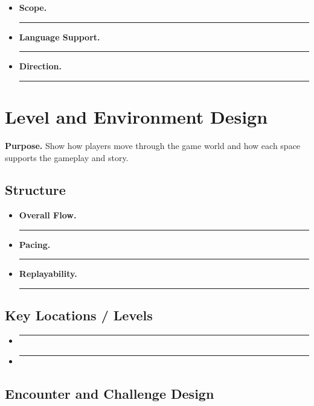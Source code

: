 \documentclass[12pt]{article}
\newcommand{\placeholder}[1]{\rule[-0.4em]{0pt}{2em}\rule{0.62\linewidth}{0.4pt}}
\begin{document}
\begin{itemize}
    \item \textbf{Scope.} \placeholder{Fully voiced, partial VO, or none.}
    \item \textbf{Language Support.} \placeholder{Supported languages and localization plans.}
    \item \textbf{Direction.} \placeholder{Desired performance style and constraints.}
\end{itemize}

\section{Level and Environment Design}

\textbf{Purpose.} Show how players move through the game world and how each space supports the
gameplay and story.

\subsection{Structure}

\begin{itemize}
    \item \textbf{Overall Flow.} \placeholder{Linear, hub-and-spoke, open world, mission-based, etc.}
    \item \textbf{Pacing.} \placeholder{How intensity, challenge, and downtime are arranged.}
    \item \textbf{Replayability.} \placeholder{Shortcuts, secrets, multiple paths, optional content, etc.}
\end{itemize}

\subsection{Key Locations / Levels}

\begin{itemize}
    \item \placeholder{List each major level or area and provide a short description.}
    \item \placeholder{Note the primary gameplay focus of each (exploration, combat, puzzle, narrative, etc.).}
\end{itemize}

\subsection{Encounter and Challenge Design}
\end{document}
